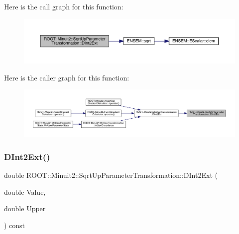 Here is the call graph for this function\+:
\nopagebreak
\begin{figure}[H]
\begin{center}
\leavevmode
\includegraphics[width=350pt]{d4/d77/classROOT_1_1Minuit2_1_1SqrtUpParameterTransformation_a82e3860242c4f0d7a81dabef95803bd1_cgraph}
\end{center}
\end{figure}
Here is the caller graph for this function\+:
\nopagebreak
\begin{figure}[H]
\begin{center}
\leavevmode
\includegraphics[width=350pt]{d4/d77/classROOT_1_1Minuit2_1_1SqrtUpParameterTransformation_a82e3860242c4f0d7a81dabef95803bd1_icgraph}
\end{center}
\end{figure}
\mbox{\label{classROOT_1_1Minuit2_1_1SqrtUpParameterTransformation_a82e3860242c4f0d7a81dabef95803bd1}} 
\subsubsection{\texorpdfstring{DInt2Ext()}{DInt2Ext()}\hspace{0.1cm}{\footnotesize\ttfamily [2/3]}}
{\footnotesize\ttfamily double R\+O\+O\+T\+::\+Minuit2\+::\+Sqrt\+Up\+Parameter\+Transformation\+::\+D\+Int2\+Ext (\begin{DoxyParamCaption}\item[{double}]{Value,  }\item[{double}]{Upper }\end{DoxyParamCaption}) const}

